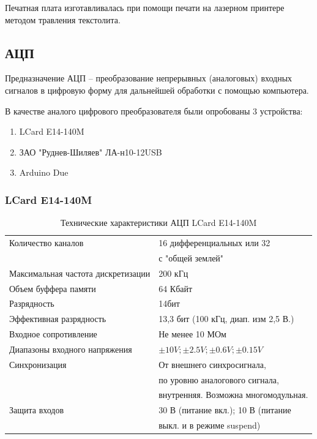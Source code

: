 \documentclass[../paper.tex]{subfiles}
\begin{document}
Печатная плата изготавливалась при помощи печати на лазерном принтере методом травления текстолита. 

\subsection{АЦП}
Предназначение АЦП – преобразование непрерывных (аналоговых) входных сигналов в цифровую форму для дальнейшей обработки с помощью компьютера.

В качестве аналого цифрового преобразователя были опробованы 3 устройства:
\begin{enumerate}
  \item LCard E14-140M
  \item ЗАО "Руднев-Шиляев" ЛА-н10-12USB
  \item Arduino Due
\end{enumerate}

\subsubsection{LCard E14-140M}

\begin{table}[H]
\centering
\label{my-label}
\begin{tabular}{|l|l|}
                                                                                    \hline
Количество каналов                 & 16 дифференциальных или 32 \\& с "общей землей" \\ \hline
Максимальная частота дискретизации & 200 кГц                                     \\ \hline
Объем буффера памяти               & 64 Кбайт                                    \\ \hline
Разрядность                        & 14бит                                       \\ \hline
Эффективная разрядность            & 13,3 бит (100 кГц, диап. изм 2,5 В.)        \\ \hline
Входное сопротивление              & Не менее 10 МОм                             \\ \hline
Диапазоны входного напряжения      & $\pm10V;\pm2.5V;\pm0.6V;\pm0.15V$           \\ \hline
Синхронизация                      & От внешнего синхросигнала, \\& по уровню аналогового сигнала, \\& внутренняя. Возможна многомодульная.          \\ \hline
Защита входов                      & 30 В (питание вкл.); 10 В (питание \\& выкл. и в режиме suspend)       \\ \hline
\end{tabular}
\caption{Технические характеристики АЦП LCard E14-140M}
\end{table}
\end{document}
